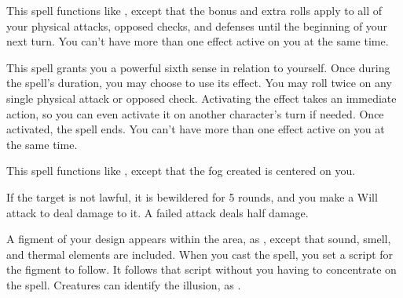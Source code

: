 \spelleffect This spell functions like , except that the bonus and extra rolls apply to all of your physical attacks, opposed checks, and defenses until the beginning of your next turn.
\spellnotes You can't have more than one  effect active on you at the same time.

\spelleffect This spell grants you a powerful sixth sense in relation to yourself. Once during the spell's duration, you may choose to use its effect. You may roll twice on any single physical attack or opposed check. Activating the effect takes an immediate action, so you can even activate it on another character's turn if needed. Once activated, the spell ends.
\spellnotes You can't have more than one  effect active on you at the same time.

\begin{comment}
\subsubsection{O-P}
\end{comment}

\spelleffect This spell functions like , except that the fog created is centered on you.
\spellnotes \fogspellnotes

\spelleffect If the target is not lawful, it is bewildered for 5 rounds, and you make a Will attack to deal damage to it. A failed attack deals half damage.

\spelldur{\durmed \dismissable}
\spellline
\spelleffect A figment of your design appears within the area, as , except that sound, smell, and thermal elements are included. When you cast the spell, you set a script for the figment to follow. It follows that script without you having to concentrate on the spell.
\spellnotes Creatures can identify the illusion, as .

